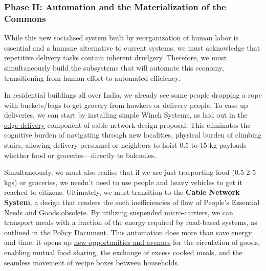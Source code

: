 \subsubsection{Phase II: Automation and the Materialization of the
Commons}\label{phase-ii-automation-and-the-materialization-of-the-commons}

While this new socialised system built by reorganization of human labor
is essential and a humane alternative to current systems, we must
acknowledge that repetitive delivery tasks contain inherent drudgery.
Therefore, we must simultaneously build the subsystems that will
automate this economy, transitioning from human effort to automated
efficiency.

In residential buildings all over India, we already see some people
dropping a rope with buckets/bags to get grocery from hawkers or
delivery people. To ease up deliveries, we can start by installing
simple Winch Systems, as laid out in the
\href{Y:/extended-human-rights/cable-network/6_edge_delivery_engineering.md}{edge
delivery} component of cable-network design proposal. This eliminates
the cognitive burden of navigating through new localities, physical
burden of climbing stairs, allowing delivery personnel or neighbors to
hoist 0.5 to 15 kg payloads---whether food or groceries---directly to
balconies.

Simultaneously, we must also realise that if we are just trasporting
food (0.5-2-5 kgs) or groceries, we needn't need to use people and heavy
vehicles to get it reached to citizens. Ultimately, we must transition
to the \textbf{Cable Network System}, a design that renders the such
inefficiencies of flow of People's Essential Needs and Goods obsolete.
By utilizing suspended micro-carriers, we can transport meals with a
fraction of the energy required by road-based systems, as outlined in
the
\href{Y:/extended-human-rights/cable-network/10_policy_document.md}{Policy
Document}. This automation does more than save energy and time; it opens
up
\href{Y:/extended-human-rights/cable-network/8_philosophical_analysis_economic_veins_capillaries.md\#new-rights-enabled-by-universal-building-connectivity}{new
opportunities and avenues} for the circulation of goods, enabling mutual
food sharing, the exchange of excess cooked meals, and the seamless
movement of recipe boxes between households.


